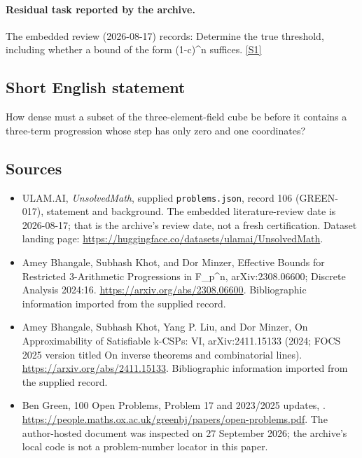 \documentclass[11pt,a4paper]{article}
\newcommand{\sref}[2]{\hyperlink{source:#1:#2}{[S#2]}}
\begin{document}
\paragraph{Residual task reported by the archive.}

The embedded review (2026-08-17) records: Determine the true threshold, including whether a bound of the form (1-c)\textasciicircum{}n suffices. \sref{106}{1}

\subsection{Short English statement}

How dense must a subset of the three-element-field cube be before it contains a three-term progression whose step has only zero and one coordinates?

\subsection{Sources}

{\small

\begin{itemize}

\item[\hypertarget{source:106:1}{S1}] ULAM.AI, \emph{UnsolvedMath}, supplied \texttt{problems.json}, record 106 (GREEN-017), statement and background. The embedded literature-review date is 2026-08-17; that is the archive’s review date, not a fresh certification. Dataset landing page: \url{https://huggingface.co/datasets/ulamai/UnsolvedMath}.

\item[\hypertarget{source:106:2}{S2}] Amey Bhangale, Subhash Khot, and Dor Minzer, Effective Bounds for Restricted 3-Arithmetic Progressions in F\_p\textasciicircum{}n, arXiv:2308.06600; Discrete Analysis 2024:16. \url{https://arxiv.org/abs/2308.06600}. Bibliographic information imported from the supplied record.

\item[\hypertarget{source:106:3}{S3}] Amey Bhangale, Subhash Khot, Yang P. Liu, and Dor Minzer, On Approximability of Satisfiable k-CSPs: VI, arXiv:2411.15133 (2024; FOCS 2025 version titled On inverse theorems and combinatorial lines). \url{https://arxiv.org/abs/2411.15133}. Bibliographic information imported from the supplied record.

\item[\hypertarget{source:106:4}{S4}] Ben Green, 100 Open Problems, Problem 17 and 2023/2025 updates, . \url{https://people.maths.ox.ac.uk/greenbj/papers/open-problems.pdf}. The author-hosted document was inspected on 27 September 2026; the archive’s local code is not a problem-number locator in this paper.

\end{itemize}

}

\label{end:106}
\end{document}
